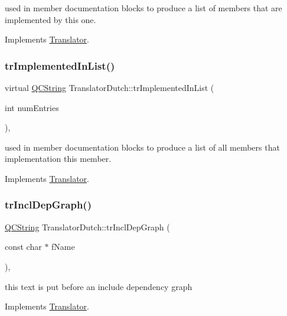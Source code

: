 used in member documentation blocks to produce a list of members that are implemented by this one. 

Implements \mbox{\hyperlink{class_translator}{Translator}}.

\mbox{\label{class_translator_dutch_a9415e39c60e6c4055e832e33894dff67}} 
\subsubsection{\texorpdfstring{trImplementedInList()}{trImplementedInList()}}
{\footnotesize\ttfamily virtual \mbox{\hyperlink{class_q_c_string}{Q\+C\+String}} Translator\+Dutch\+::tr\+Implemented\+In\+List (\begin{DoxyParamCaption}\item[{int}]{num\+Entries }\end{DoxyParamCaption})\hspace{0.3cm}{\ttfamily [inline]}, {\ttfamily [virtual]}}

used in member documentation blocks to produce a list of all members that implementation this member. 

Implements \mbox{\hyperlink{class_translator}{Translator}}.

\mbox{\label{class_translator_dutch_a3aafa4ebdd42932394a07d38a1e7919e}} 
\subsubsection{\texorpdfstring{trInclDepGraph()}{trInclDepGraph()}}
{\footnotesize\ttfamily \mbox{\hyperlink{class_q_c_string}{Q\+C\+String}} Translator\+Dutch\+::tr\+Incl\+Dep\+Graph (\begin{DoxyParamCaption}\item[{const char $\ast$}]{f\+Name }\end{DoxyParamCaption})\hspace{0.3cm}{\ttfamily [inline]}, {\ttfamily [virtual]}}

this text is put before an include dependency graph 

Implements \mbox{\hyperlink{class_translator}{Translator}}.

